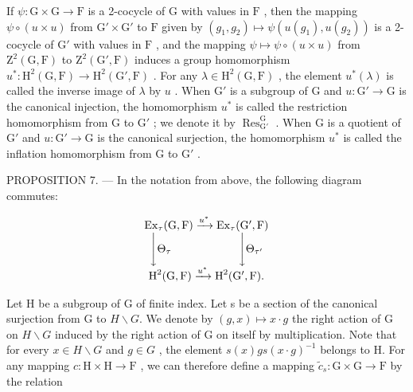 If \(\psi : \mathrm{G} \times \mathrm{G} \to \mathrm{F}\) is a 2-cocycle of \(\mathrm{G}\) with values in \(\mathrm{F}\) , then the mapping \(\psi \circ (u \times u)\) from \(\mathrm{G}' \times \mathrm{G}'\) to \(\mathrm{F}\) given by \((g_1, g_2) \mapsto \psi(u(g_1), u(g_2))\) is a 2-cocycle of \(\mathrm{G}'\) with values in \(\mathrm{F}\) , and the mapping \(\psi \mapsto \psi \circ (u \times u)\) from \(\mathrm{Z}^2(\mathrm{G}, \mathrm{F})\) to \(\mathrm{Z}^2(\mathrm{G}', \mathrm{F})\) induces a group homomorphism \(u^*: \mathrm{H}^2(\mathrm{G}, \mathrm{F}) \to \mathrm{H}^2(\mathrm{G}', \mathrm{F})\) . For any \(\lambda \in \mathrm{H}^2(\mathrm{G}, \mathrm{F})\) , the element \(u^*(\lambda)\) is called the inverse image of \(\lambda\) by \(u\) . When \(\mathrm{G}'\) is a subgroup of \(\mathrm{G}\) and \(u: \mathrm{G}' \to \mathrm{G}\) is the canonical injection, the homomorphism \(u^*\) is called the restriction homomorphism from \(\mathrm{G}\) to \(\mathrm{G}'\) ; we denote it by \(\operatorname{Res}_{\mathrm{G}'}^{\mathrm{G}}\) . When \(\mathrm{G}\) is a quotient of \(\mathrm{G}'\) and \(u: \mathrm{G}' \to \mathrm{G}\) is the canonical surjection, the homomorphism \(u^*\) is called the inflation homomorphism from \(\mathrm{G}\) to \(\mathrm{G}'\) .

PROPOSITION 7. --- In the notation from above, the following diagram commutes:

\[
\begin{array}{c} \operatorname{Ex} _ {\tau} (\mathrm{G}, \mathrm{F}) \xrightarrow {u ^ {*}} \operatorname{Ex} _ {\tau} (\mathrm{G} ^ {\prime}, \mathrm{F}) \\ \Biggl \downarrow \Theta_ {\tau} \qquad \qquad \qquad \Biggl \downarrow \Theta_ {\tau^ {\prime}} \\ \operatorname{H} ^ {2} (\mathrm{G}, \mathrm{F}) \xrightarrow {u ^ {*}} \operatorname{H} ^ {2} (\mathrm{G} ^ {\prime}, \mathrm{F})  . \end{array}
\]

Let H be a subgroup of G of finite index. Let s be a section of the canonical surjection from G to \(H\backslash G\). We denote by \((g,x)\mapsto x\cdot g\) the right action of G on \(H\backslash G\) induced by the right action of G on itself by multiplication. Note that for every \(x\in H\backslash G\) and \(g\in G\) , the element \(s(x)gs(x\cdot g)^{-1}\) belongs to H. For any mapping \(c: \mathrm{H} \times \mathrm{H} \to \mathrm{F}\) , we can therefore define a mapping \(\widetilde{c}_s: \mathrm{G} \times \mathrm{G} \to \mathrm{F}\) by the relation

